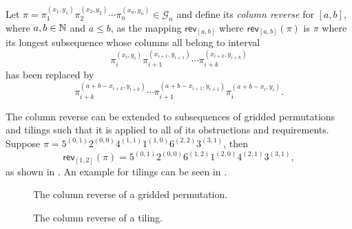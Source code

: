 \begin{definition}\label{def:rrgp}
Let $\pi=\pi_1^{(x_1,y_1)}\pi_2^{(x_2,y_2)}\dotsm\pi_n^{(x_n,y_n)} \in \mathcal{G}_n$ and define its \emph{column reverse} for $[a,b]$, where $a,b\in\mathbb{N}$ and $a\leq b$, as the mapping $\textsf{rev}_{[a,b]}$ where $\textsf{rev}_{[a,b]}(\pi)$ is $\pi$ where its longest subsequence whose columns all belong to interval
\[
\pi_{i}^{(x_i,y_i)}\pi_{i+1}^{(x_{i+1},y_{i+1})}\dotsm\pi_{i+k}^{(x_{i+k},y_{i+k})}
\]
has been replaced by 
\[
    \pi_{i+k}^{(a+b-x_{i+k},y_{i+k})}\dotsm\pi_{i+1}^{(a+b-x_{i+1},y_{i+1})}\pi_{i}^{(a+b-x_i,y_i)}.
\]
\end{definition}

The column reverse can be extended to subsequences of gridded permutations and tilings such that it is applied to all of its obstructions and requirements. Suppose $\pi = 5^{(0,1)}2^{(0,0)}4^{(1,1)}1^{(1,0)}6^{(2,2)}3^{(3,1)}$, then 
\[
\textsf{rev}_{[1,2]}(\pi) = 5^{(0,1)}2^{(0,0)}6^{(1,2)}1^{(2,0)}4^{(2,1)}3^{(3,1)},
\]
as shown in . An example for tilings can be seen in .

\begin{figure}[ht!]
    \centering
    
    \caption{The column reverse of a gridded permutation.}
    \label{fig:gp_col_rev}
\end{figure}

\begin{figure}[ht!]
    \centering
    
    \caption{The column reverse of a tiling.}
    \label{fig:t_col_rev}
\end{figure}

